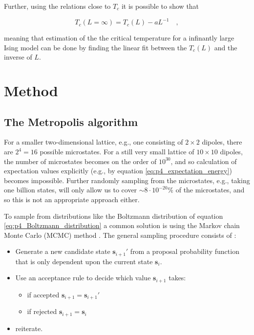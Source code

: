\documentclass[../main_proj4_correct_template.tex]{subfiles}
\begin{document}
Further, using the relations close to $T_c$ it is possible to show that 

\begin{equation}
    T_c(L=\infty) = T_c(L) - aL^{-1} \quad, 
\end{equation}

meaning that estimation of the the critical temperature for a infinantly large Ising model can be done by finding the linear fit between the $T_c(L)$ and the inverse of $L$. 



\section{Method}\label{sec:p4_method}

\subsection{The Metropolis algorithm}

For a smaller two-dimensional lattice, e.g., one consisting of $2\times 2$ dipoles, there are $2^{4}=16$ possible microstates. For a still very small lattice of $10\times 10$ dipoles, the number of microstates becomes on the order of $10^{30}$, and so calculation of expectation values explicitly (e.g., by equation \eqref{eq:p4_expectation_energy}) becomes impossible. Further randomly sampling from the microstates, e.g., taking one billion states, will only allow us to cover $\sim 8\cdot10^{-20} \%$ of the microstates, and so this is not an appropriate approach either.

To sample from distributions like the Boltzmann distribution of equation \eqref{eq:p4_Boltzmann_distribution} a common solution is using the Markov chain Monte Carlo (MCMC) method \cite{lecture_notes}. The general sampling procedure consists of :
\begin{itemize}
    \item Generate a new candidate state $\mathbf{s}_{i+1}'$ from a proposal probability function that is only dependent upon the current state $\mathbf{s}_i$.
    \item Use an acceptance rule to decide which value $\mathbf{s}_{i+1}$ takes:
    \begin{itemize}
        \item if accepted $\mathbf{s}_{i+1} = \mathbf{s}_{i+1}'$
        \item if rejected $\mathbf{s}_{i+1} = \mathbf{s}_i$
    \end{itemize}
    \item reiterate.
\end{itemize}
\end{document}
